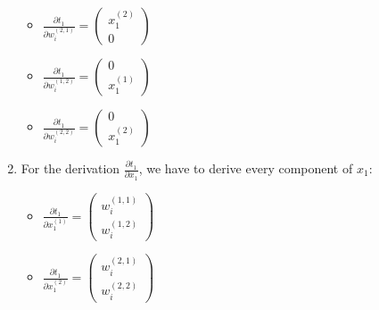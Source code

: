 \documentclass[a4paper]{article}
\begin{document}
\begin{enumerate}
\begin{itemize}
                    \item $\frac{\partial t_1}{\partial w_i^{(2,1)}} = \left( \begin{matrix} x_1^{(2)} \\ 0 \end{matrix} \right)$
                    \item $\frac{\partial t_1}{\partial w_i^{(1,2)}} = \left( \begin{matrix} 0 \\ x_1^{(1)} \end{matrix} \right)$
                    \item $\frac{\partial t_1}{\partial w_i^{(2,2)}} = \left( \begin{matrix} 0 \\ x_1^{(2)} \end{matrix} \right)$
                \end{itemize}
            \item For the derivation $\frac{\partial t_1}{\partial x_1}$, we have to derive every component of $x_1$:
                \begin{itemize}
                    \item $\frac{\partial t_1}{\partial x_1^{(1)}} = \left( \begin{matrix} w_i^{(1,1)} \\ w_i^{(1,2)} \end{matrix} \right)$
                    \item $\frac{\partial t_1}{\partial x_1^{(2)}} = \left( \begin{matrix} w_i^{(2,1)} \\ w_i^{(2,2)} \end{matrix} \right)$
                \end{itemize}
        \end{enumerate}
        
\end{document}
